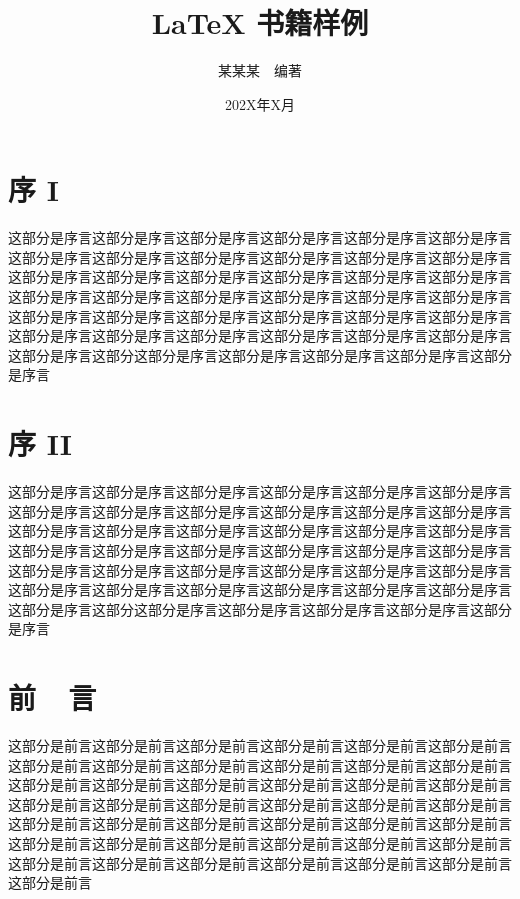 \documentclass[openany,twoside,12pt]{book}
\title{\bfseries LaTeX 书籍样例}
\author{\fangsong 某某某~~编著}
\date{\fangsong 202X年X月}
\theoremstyle{plain}
\begin{document}
\maketitle  %

\thispagestyle{empty}



\frontmatter   %




\chapter{序 I}

这部分是序言这部分是序言这部分是序言这部分是序言这部分是序言这部分是序言这部分是序言这部分是序言这部分是序言这部分是序言这部分是序言这部分是序言这部分是序言这部分是序言这部分是序言这部分是序言这部分是序言这部分是序言这部分是序言这部分是序言这部分是序言这部分是序言这部分是序言这部分是序言这部分是序言这部分是序言这部分是序言这部分是序言这部分是序言这部分是序言这部分是序言这部分是序言这部分是序言这部分是序言这部分是序言这部分是序言这部分是序言这部分这部分是序言这部分是序言这部分是序言这部分是序言这部分是序言


\chapter{序 II}

这部分是序言这部分是序言这部分是序言这部分是序言这部分是序言这部分是序言这部分是序言这部分是序言这部分是序言这部分是序言这部分是序言这部分是序言这部分是序言这部分是序言这部分是序言这部分是序言这部分是序言这部分是序言这部分是序言这部分是序言这部分是序言这部分是序言这部分是序言这部分是序言这部分是序言这部分是序言这部分是序言这部分是序言这部分是序言这部分是序言这部分是序言这部分是序言这部分是序言这部分是序言这部分是序言这部分是序言这部分是序言这部分这部分是序言这部分是序言这部分是序言这部分是序言这部分是序言

\chapter{前~~言}

这部分是前言这部分是前言这部分是前言这部分是前言这部分是前言这部分是前言这部分是前言这部分是前言这部分是前言这部分是前言这部分是前言这部分是前言这部分是前言这部分是前言这部分是前言这部分是前言这部分是前言这部分是前言这部分是前言这部分是前言这部分是前言这部分是前言这部分是前言这部分是前言这部分是前言这部分是前言这部分是前言这部分是前言这部分是前言这部分是前言这部分是前言这部分是前言这部分是前言这部分是前言这部分是前言这部分是前言这部分是前言这部分是前言这部分是前言这部分是前言这部分是前言这部分是前言这部分是前言
\end{document}
